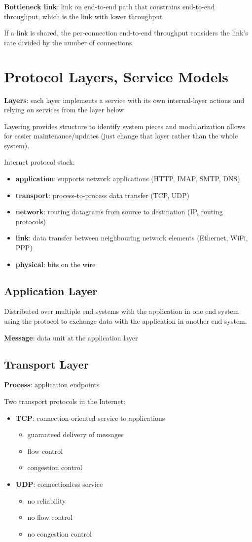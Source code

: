 \documentclass[11pt]{article}
\begin{document}
\textbf{Bottleneck link}: link on end-to-end path that constrains end-to-end throughput,
which is the link with lower throughput

If a link is shared, the per-connection end-to-end throughput considers the link's rate divided
by the number of connections.
\section{Protocol Layers, Service Models}
\label{sec:org971d297}
\textbf{Layers}: each layer implements a service with its own internal-layer actions and relying on services
from the layer below

Layering provides structure to identify system pieces and modularization allows for easier
maintenance/updates (just change that layer rather than the whole system).

Internet protocol stack:
\begin{itemize}
\item \textbf{application}: supports network applications (HTTP, IMAP, SMTP, DNS)
\item \textbf{transport}: process-to-process data transfer (TCP, UDP)
\item \textbf{network}: routing datagrams from source to destination (IP, routing protocols)
\item \textbf{link}: data transfer between neighbouring network elements (Ethernet, WiFi, PPP)
\item \textbf{physical}: bits on the wire
\end{itemize}
\subsection{Application Layer}
\label{sec:org5544773}
Distributed over multiple end systems with the application in one end system using the protocol
to exchange data with the application in another end system.

\textbf{Message}: data unit at the application layer
\subsection{Transport Layer}
\label{sec:orgbe3e99a}
\textbf{Process}: application endpoints

Two transport protocols in the Internet:
\begin{itemize}
\item \textbf{TCP}: connection-oriented service to applications
\begin{itemize}
\item guaranteed delivery of messages
\item flow control
\item congestion control
\end{itemize}
\item \textbf{UDP}: connectionless service
\begin{itemize}
\item no reliability
\item no flow control
\item no congestion control
\end{itemize}
\end{itemize}
\end{document}
